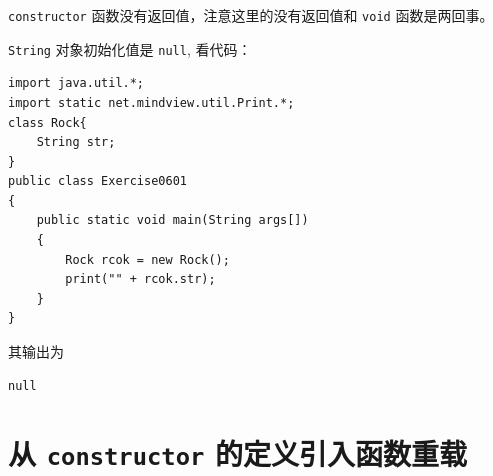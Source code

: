 \documentclass[10pt,a4paper,UTF8]{article}
\begin{document}
\texttt{constructor} 函数没有返回值，注意这里的没有返回值和 \texttt{void} 函数是两回事。

\texttt{String} 对象初始化值是 \texttt{null}, 看代码：
\begin{verbatim}
import java.util.*;
import static net.mindview.util.Print.*;
class Rock{
    String str;
}
public class Exercise0601
{
    public static void main(String args[])
    {
        Rock rcok = new Rock();
        print("" + rcok.str);
    }
}
\end{verbatim}

其输出为
\begin{verbatim}
null
\end{verbatim}

\section{从 \texttt{constructor} 的定义引入函数重载}
\label{sec:org382d7f0}
\end{document}
